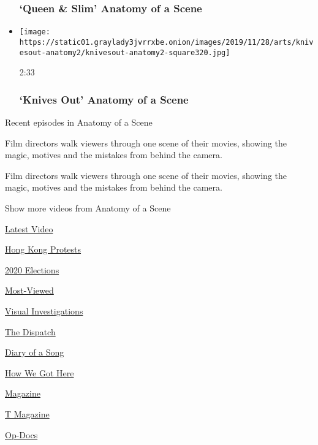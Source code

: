 \begin{itemize}
{  \subsubsection{`Queen \& Slim' \textbar{} Anatomy of a
  Scene}\label{queen--slim--anatomy-of-a-scene}}
\item
  \href{https://www.nytimes3xbfgragh.onion/video/movies/100000006846655/knives-out-scene.html?action=click\&module=video-series-bar\&region=header\&pgtype=Article\&playlistId=video/anatomy-of-a-scene}{}

  \texttt{[image: https://static01.graylady3jvrrxbe.onion/images/2019/11/28/arts/knivesout-anatomy2/knivesout-anatomy2-square320.jpg]}

  2:33

  \hypertarget{knives-out--anatomy-of-a-scene}{%
  \subsubsection{`Knives Out' \textbar{} Anatomy of a
  Scene}\label{knives-out--anatomy-of-a-scene}}
\end{itemize}

Recent episodes in Anatomy of a Scene

Film directors walk viewers through one scene of their movies, showing
the magic, motives and the mistakes from behind the camera.

Film directors walk viewers through one scene of their movies, showing
the magic, motives and the mistakes from behind the camera.

Show more videos from Anatomy of a Scene

\href{/video}{}

\href{/video/latest-video}{Latest Video}

\href{/video/hk-protest}{Hong Kong Protests}

\href{/video/2020-Elections}{2020 Elections}

\href{/video/Most-Viewed}{Most-Viewed}

\href{/video/investigations}{Visual Investigations}

\href{/video/on-the-ground}{The Dispatch}

\href{/video/diaryofasong}{Diary of a Song}

\href{/video/how-we-got-here}{How We Got Here}

\href{/video/magazine}{Magazine}

\href{/video/t-magazine}{T Magazine}

\href{/video/op-docs}{Op-Docs}

